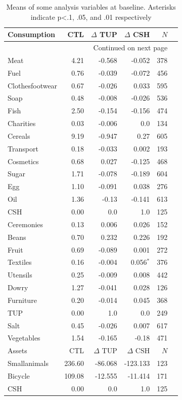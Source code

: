 \documentclass[12pt,article]{article}
\begin{document}
\begin{longtable}{lrrrrr}
\caption{\label{tab:balance_check}Means of some analysis variables at baseline.  Asterisks indicate p<.1, .05, and .01 respectively}
\\
\hline
Consumption & CTL & $\Delta$ TUP & $\Delta$ CSH & $N$\\
\hline
\endhead
\hline\multicolumn{5}{r}{Continued on next page} \\
\endfoot
\endlastfoot
Meat & 4.21 & -0.568 & -0.052 & 378\\
Fuel & 0.76 & -0.039 & -0.072 & 456\\
Clothesfootwear & 0.67 & -0.026 & 0.033 & 595\\
Soap & 0.48 & -0.008 & -0.026 & 536\\
Fish & 2.50 & -0.154 & -0.156 & 474\\
Charities & 0.03 & -0.006 & 0.0 & 134\\
Cereals & 9.19 & -0.947 & 0.27 & 605\\
Transport & 0.18 & -0.033 & 0.002 & 193\\
Cosmetics & 0.68 & 0.027 & -0.125 & 468\\
Sugar & 1.71 & -0.078 & -0.189 & 604\\
Egg & 1.10 & -0.091 & 0.038 & 276\\
Oil & 1.36 & -0.13 & -0.141 & 613\\
CSH & 0.00 & 0.0 & 1.0 & 125\\
Ceremonies & 0.13 & 0.006 & 0.026 & 152\\
Beans & 0.70 & 0.232 & 0.226 & 192\\
Fruit & 0.69 & -0.089 & 0.001 & 272\\
Textiles & 0.16 & -0.004 & 0.056$^{\text{*}}$ & 376\\
Utensils & 0.25 & -0.009 & 0.008 & 442\\
Dowry & 1.27 & -0.041 & 0.028 & 126\\
Furniture & 0.20 & -0.014 & 0.045 & 368\\
TUP & 0.00 & 1.0 & 0.0 & 249\\
Salt & 0.45 & -0.026 & 0.007 & 617\\
Vegetables & 1.54 & -0.165 & -0.18 & 471\\
\hline
Assets & CTL & $\Delta$ TUP & $\Delta$ CSH & $N$\\
\hline
Smallanimals & 236.60 & -86.068 & -123.133 & 123\\
Bicycle & 109.08 & -12.555 & -11.414 & 171\\
CSH & 0.00 & 0.0 & 1.0 & 125\\

\end{longtable}
\end{document}
